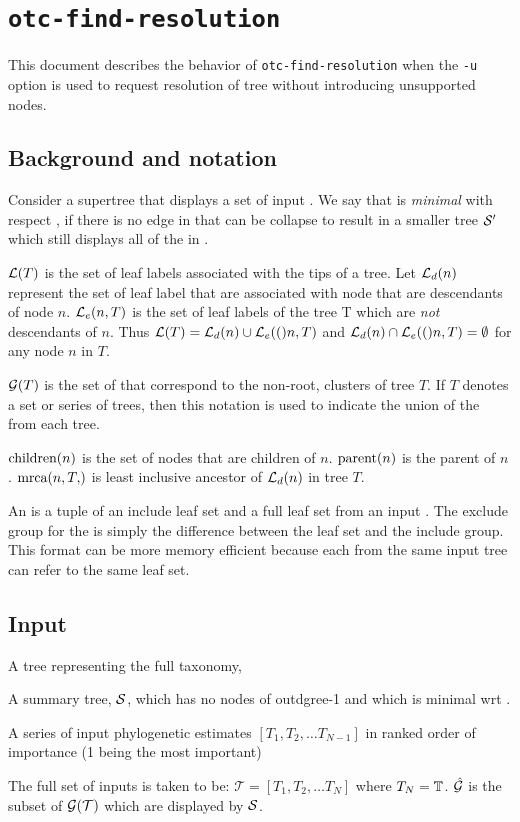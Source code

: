 \documentclass[11pt]{article}
\begin{document}
\section*{\texttt{otc-find-resolution}}
This document describes the behavior of \texttt{otc-find-resolution} when the \texttt{-u}
    option is used to request resolution of tree without introducing unsupported nodes.

\subsection*{Background and notation}
Consider a supertree \summaryTree that displays a set of input \pss \pssInOptimalTree.
We say that \summaryTree is {\em minimal} with respect \pssInOptimalTree, if there is
    no edge in \summaryTree that can be collapse to result in a smaller tree $\mathcal{S}^{\prime}$
    which still displays all of the \pss in \pssInOptimalTree.

$\mathcal{L}(T)$ is the set of leaf labels associated with the tips of a tree.
Let $\mathcal{L}_d(n)$ represent the set of leaf label that are associated with node that are descendants
    of node $n$.
$\mathcal{L}_e(n, T)$ is the set of leaf labels of the tree T which are {\em not} descendants of $n$.
Thus $\mathcal{L}(T) = \mathcal{L}_d(n) \cup \mathcal{L}_e(()n, T)$ and $\mathcal{L}_d(n) \cap \mathcal{L}_e(()n, T)=\emptyset$ for any node $n$ in $T$.

$\mathcal{G}(T)$ is the set of \pss that correspond to the non-root, clusters of tree $T$.
If $T$ denotes a set or series of trees, then this notation is used to indicate the union of the \pss from each tree.

$\mbox{children}(n)$ is the set of nodes that are children of $n$.
$\mbox{parent}(n)$ is the parent of $n$.
$\mrca{n, T}$ is least inclusive ancestor of $\mathcal{L}_d(n)$ in tree $T$.

An \incLSSS is a tuple of an include leaf set and a full leaf set from an input \pss.
The exclude group for the \pss is simply the difference between the leaf set and the include group.
This format can be more memory efficient because each \incLSSS from the same input tree
can refer to the same leaf set.

\subsection*{Input}
\begin{compactitem}
    \item A tree representing the full taxonomy, \taxonomy
    \item A summary tree, $\mathcal{S}$, which has no nodes of outdgree-1 and which is minimal wrt \pssInOptimalTree.
    \item A series of input phylogenetic estimates  $[T_1, T_2, \ldots T_{N-1}]$ in ranked order of importance (1 being the most important)
\end{compactitem}
The full set of inputs is taken to be: $\mathcal{T} = [T_1, T_2, \ldots T_{N}]$ where $T_N = \mathbb{T}$.
    $\hat{\mathcal{G}}$ is the subset of $\mathcal{G}(\mathcal{T})$ which are displayed by $\mathcal{S}$.
\end{document}
